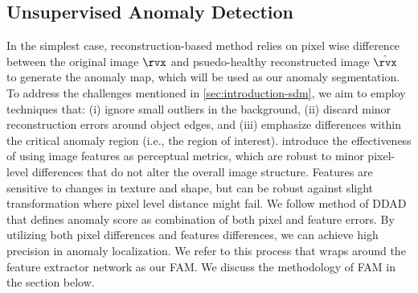 \subsection{Unsupervised Anomaly Detection}
\label{sec:fam}


In the simplest case, reconstruction-based method relies on pixel wise difference between the original image $\rvx$ and psuedo-healthy reconstructed image $\hat{\rvx}$ to generate the anomaly map, which will be used as our anomaly segmentation. To address the challenges mentioned in \cref{sec:introduction-sdm}, we aim to employ techniques that: (i) ignore small outliers in the background, (ii) discard minor reconstruction errors around object edges, and (iii) emphasize differences within the critical anomaly region (i.e., the region of interest). \cite{zhang2018unreasonableeffectivenessdeepfeatures} introduce the effectiveness of using image features as perceptual metrics, which are robust to minor pixel-level differences that do not alter the overall image structure. Features are sensitive to changes in texture and shape, but can be robust against slight transformation where pixel level distance might fail. We follow method of DDAD \cite{DDAD} that defines anomaly score as combination of both pixel and feature errors. By utilizing both pixel differences and features differences, we can achieve high precision in anomaly localization. We refer to this process that wraps around the feature extractor network as our \ac{FAM}. We discuss the methodology of \ac{FAM} in the section below. 


